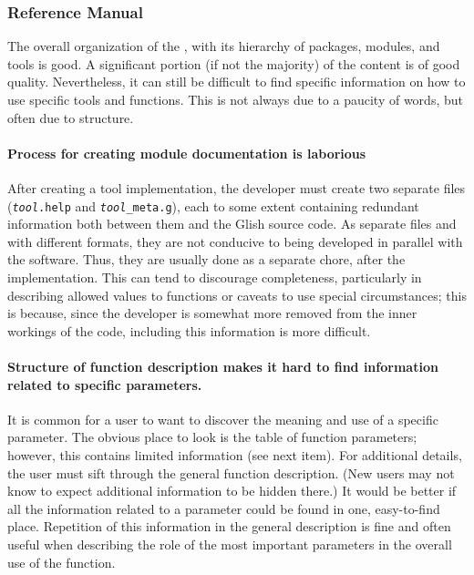 \subsubsection{Reference Manual}

The overall organization of the , with its hierarchy of
packages, modules, and tools is good.  A significant portion (if not
the majority) of the content is of good quality.  Nevertheless, it can
still be difficult to find specific information on how to use specific
tools and functions.  This is not always due to a paucity of words,
but often due to structure.  

\paragraph{Process for creating module documentation is laborious}
After creating a tool implementation, the developer must create two
separate files ({\tt {\it tool}.help} and {\tt {\it tool}\_meta.g}),
each to some extent containing redundant information both between them
and the Glish source code.  As separate files and with different
formats, they are not conducive to being developed in parallel with
the software.  Thus, they are usually done as a separate chore, after
the implementation.  This can tend to discourage completeness,
particularly in describing allowed values to functions or caveats to use
special circumstances; this is because, since the developer is
somewhat more removed from the inner workings of the code, including
this information is more difficult.  

\paragraph{Structure of function description makes it hard to find
information related to specific parameters.}  It is common for a user
to want to discover the meaning and use of a specific parameter.  The
obvious place to look is the table of function parameters; however,
this contains limited information (see next item).  For additional
details, the user must sift through the general function description.
(New users may not know to expect additional information to be hidden
there.)  It would be better if all the information related to a
parameter could be found in one, easy-to-find place.  Repetition of
this information in the general description is fine and often useful
when describing the role of the most important parameters in the
overall use of the function.

